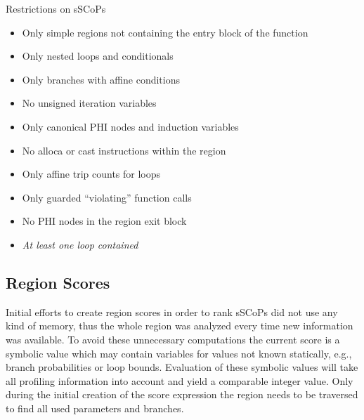 \begin{table}[htbp]
\begin{framed}
  \centering
  \caption{Restrictions on sSCoPs}
    \begin{itemize}
      \renewcommand{\labelitemi}{$\triangleright$}
      \item Only simple regions not containing the entry block of the function
      \item Only nested loops and conditionals
      \item Only branches with affine conditions
      \item No unsigned iteration variables
      \item Only canonical PHI nodes and induction variables
      \item No alloca or cast instructions within the region
      \item Only affine trip counts for loops
      \item Only guarded ``violating'' function calls
      \item No PHI nodes in the region exit block
      \item \textit{At least one loop contained}
    \end{itemize}
  \label{tab:sSCoPConstraints}
  \label{tab:sSCoPRestrictions}
  \label{sSCoPRestrictionsPage}
\end{framed}
\end{table}

\subsection{Region Scores}
Initial efforts to create region scores in order to rank sSCoPs 
did not use any kind of memory, 
thus the whole region was analyzed every time new information was available.
To avoid these unnecessary computations the current score is a
symbolic value which may contain variables for values not known statically, e.g.,
branch probabilities or loop bounds.
Evaluation of these symbolic values will take all profiling 
information into account and yield a comparable integer value. 
Only during the initial creation of the score expression the region needs to be
traversed to find all used parameters and branches. 



